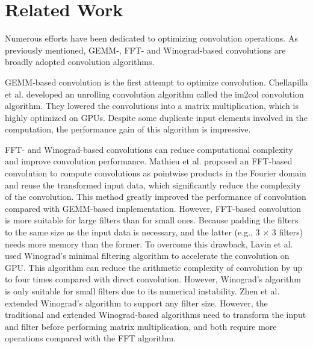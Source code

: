 \section{Related Work}
Numerous efforts have been dedicated to optimizing convolution operations. As previously mentioned, GEMM-, FFT- and
Winograd-based convolutions are broadly adopted convolution algorithms.

GEMM-based convolution is the first attempt to optimize convolution. Chellapilla et al. \cite{Chellapilla2006High} developed an unrolling
convolution algorithm  called the im2col convolution algorithm. They lowered the convolutions into a matrix multiplication, which is
highly optimized on GPUs. Despite some duplicate input elements involved in the computation, the performance gain of this algorithm is impressive.

FFT- and Winograd-based convolutions can reduce computational complexity and improve convolution performance. Mathieu et al.
\cite{mathieu2013fast} proposed an FFT-based convolution to compute convolutions as pointwise products in the Fourier domain and reuse the
transformed input data, which significantly reduce the complexity of the convolution. This method greatly improved the
performance of convolution compared with GEMM-based implementation. However, FFT-based convolution is more suitable for large filters than
for small ones. Because padding the filters to the same size as the input data is necessary, and  the latter (e.g., 3 × 3 filters) needs
more memory than the former. To overcome this drawback, Lavin et al. \cite{lavin2016fast} used Winograd's minimal filtering algorithm to
accelerate the convolution on GPU. This algorithm can reduce the arithmetic complexity of convolution by up to four times compared with
direct convolution. However, Winograd's algorithm is only suitable for small filters due to its numerical instability.
Zhen et al. \cite{Zhen2018Optimizing} extended Winograd's algorithm to support any filter size. However, the traditional and extended Winograd-based
algorithms need to transform the input and filter before performing matrix multiplication, and both require more operations compared with
the FFT algorithm.

